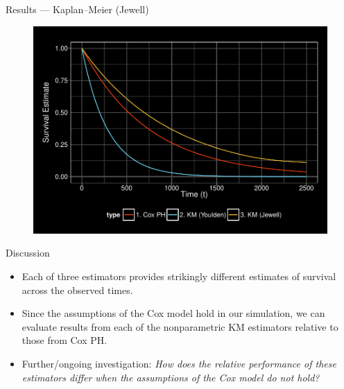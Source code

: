 \documentclass[12pt,t,handout]{beamer}
\begin{document}
\begin{frame}[c]{Results --- Kaplan--Meier (Jewell)}

\begin{center}
\begin{figure}[H]
\begin{center}
\includegraphics[width=\textwidth]{Figs/s1_cox_youlden_jewell.pdf}
\end{center}
\label{fig:s1_cox_youlden_jewll}
\end{figure}
\end{center}

\note{
}

\end{frame}


\begin{frame}[c]{Discussion}

\begin{center}
\begin{itemize}
  \itemsep12pt
  \item Each of three estimators provides strikingly different estimates of
    survival across the observed times.
  \item Since the assumptions of the Cox model hold in our simulation, we can
    evaluate results from each of the nonparametric KM estimators relative to
    those from Cox PH.
  \item Further/ongoing investigation: \textit{How does the relative performance
    of these estimators differ when the assumptions of the Cox model do not
    hold?}
\end{itemize}
\end{center}

\note{
}

\end{frame}
\end{document}
